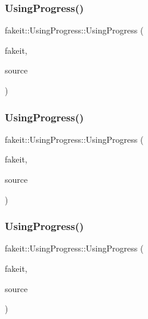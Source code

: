 \subsubsection{\texorpdfstring{UsingProgress()}{UsingProgress()}\hspace{0.1cm}{\footnotesize\ttfamily [6/9]}}
{\footnotesize\ttfamily fakeit\+::\+Using\+Progress\+::\+Using\+Progress (\begin{DoxyParamCaption}\item[{\mbox{\hyperlink{structfakeit_1_1FakeitContext}{fakeit\+::\+Fakeit\+Context}} \&}]{fakeit,  }\item[{\mbox{\hyperlink{structfakeit_1_1InvocationsSourceProxy}{Invocations\+Source\+Proxy}}}]{source }\end{DoxyParamCaption})\hspace{0.3cm}{\ttfamily [inline]}}

\mbox{\label{classfakeit_1_1UsingProgress_ac87db7ffa3ed53507cb2c98c2c0b4ee7}} 
\subsubsection{\texorpdfstring{UsingProgress()}{UsingProgress()}\hspace{0.1cm}{\footnotesize\ttfamily [7/9]}}
{\footnotesize\ttfamily fakeit\+::\+Using\+Progress\+::\+Using\+Progress (\begin{DoxyParamCaption}\item[{\mbox{\hyperlink{structfakeit_1_1FakeitContext}{fakeit\+::\+Fakeit\+Context}} \&}]{fakeit,  }\item[{\mbox{\hyperlink{structfakeit_1_1InvocationsSourceProxy}{Invocations\+Source\+Proxy}}}]{source }\end{DoxyParamCaption})\hspace{0.3cm}{\ttfamily [inline]}}

\mbox{\label{classfakeit_1_1UsingProgress_ac87db7ffa3ed53507cb2c98c2c0b4ee7}} 
\subsubsection{\texorpdfstring{UsingProgress()}{UsingProgress()}\hspace{0.1cm}{\footnotesize\ttfamily [8/9]}}
{\footnotesize\ttfamily fakeit\+::\+Using\+Progress\+::\+Using\+Progress (\begin{DoxyParamCaption}\item[{\mbox{\hyperlink{structfakeit_1_1FakeitContext}{fakeit\+::\+Fakeit\+Context}} \&}]{fakeit,  }\item[{\mbox{\hyperlink{structfakeit_1_1InvocationsSourceProxy}{Invocations\+Source\+Proxy}}}]{source }\end{DoxyParamCaption})\hspace{0.3cm}{\ttfamily [inline]}}

